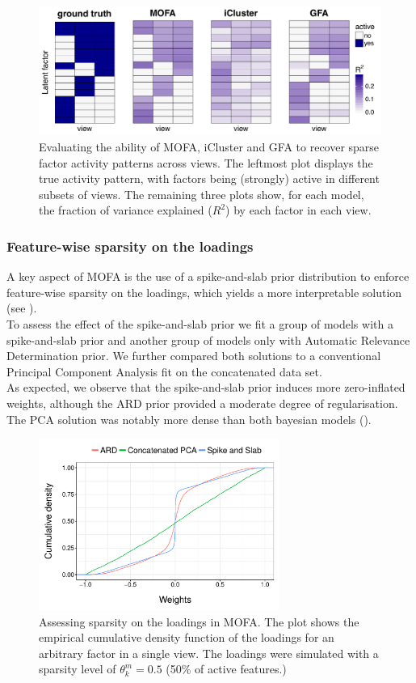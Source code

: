 \begin{figure}[H]
	\centering 	
	\includegraphics[width=1.0\textwidth]{MOFA_group_sparsity}
	\caption{Evaluating the ability of MOFA, iCluster and GFA to recover sparse factor activity patterns across views. The leftmost plot displays the true activity pattern, with factors being (strongly) active in different subsets of views. The remaining three plots show, for each model, the fraction of variance explained ($R^2$) by each factor in each view.}
	\label{fig:MOFA_group_sparsity}
\end{figure}

\subsubsection{Feature-wise sparsity on the loadings}
A key aspect of MOFA is the use of a spike-and-slab prior distribution to enforce feature-wise sparsity on the loadings, which yields a more interpretable solution (see ).\\
To assess the effect of the spike-and-slab prior we fit a group of models with a spike-and-slab prior and another group of models only with Automatic Relevance Determination prior. We further compared both solutions to a conventional Principal Component Analysis fit on the concatenated data set.\\
As expected, we observe that the spike-and-slab prior induces more zero-inflated weights, although the ARD prior provided a moderate degree of regularisation. The PCA solution was notably more dense than both bayesian models ().

\begin{figure}[H]
	\centering 	
	\includegraphics[width=0.7\textwidth]{MOFA_sparsity}
	\caption{Assessing sparsity on the loadings in MOFA. The plot shows the empirical cumulative density function of the loadings for an arbitrary factor in a single view. The loadings were simulated with a sparsity level of $\theta_k^m=0.5$ (50\% of active features.)
	}
	\label{fig:MOFA_sparsity}
\end{figure}


